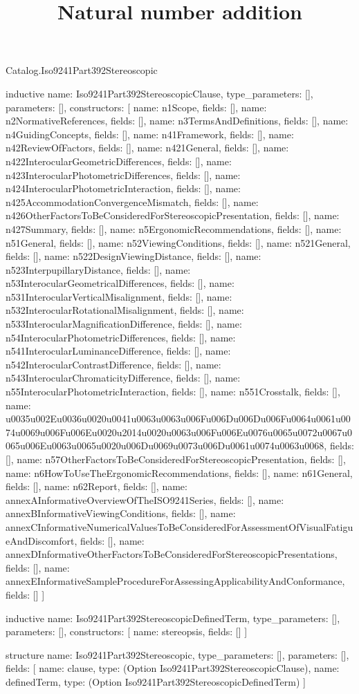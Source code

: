 \begin{lexlean}{Catalog.Iso9241Part392Stereoscopic}
\title{Natural number addition}
\begin{semanticmodule}
inductive{
  name: Iso9241Part392StereoscopicClause,
  type_parameters: [],
  parameters: [],
  constructors: [
    {name: n1Scope, fields: []},
    {name: n2NormativeReferences, fields: []},
    {name: n3TermsAndDefinitions, fields: []},
    {name: n4GuidingConcepts, fields: []},
    {name: n41Framework, fields: []},
    {name: n42ReviewOfFactors, fields: []},
    {name: n421General, fields: []},
    {name: n422InterocularGeometricDifferences, fields: []},
    {name: n423InterocularPhotometricDifferences, fields: []},
    {name: n424InterocularPhotometricInteraction, fields: []},
    {name: n425AccommodationConvergenceMismatch, fields: []},
    {name: n426OtherFactorsToBeConsideredForStereoscopicPresentation, fields: []},
    {name: n427Summary, fields: []},
    {name: n5ErgonomicRecommendations, fields: []},
    {name: n51General, fields: []},
    {name: n52ViewingConditions, fields: []},
    {name: n521General, fields: []},
    {name: n522DesignViewingDistance, fields: []},
    {name: n523InterpupillaryDistance, fields: []},
    {name: n53InterocularGeometricalDifferences, fields: []},
    {name: n531InterocularVerticalMisalignment, fields: []},
    {name: n532InterocularRotationalMisalignment, fields: []},
    {name: n533InterocularMagnificationDifference, fields: []},
    {name: n54InterocularPhotometricDifferences, fields: []},
    {name: n541InterocularLuminanceDifference, fields: []},
    {name: n542InterocularContrastDifference, fields: []},
    {name: n543InterocularChromaticityDifference, fields: []},
    {name: n55InterocularPhotometricInteraction, fields: []},
    {name: n551Crosstalk, fields: []},
    {name: u0035u002Eu0036u0020u0041u0063u0063u006Fu006Du006Du006Fu0064u0061u0074u0069u006Fu006Eu0020u2014u0020u0063u006Fu006Eu0076u0065u0072u0067u0065u006Eu0063u0065u0020u006Du0069u0073u006Du0061u0074u0063u0068, fields: []},
    {name: n57OtherFactorsToBeConsideredForStereoscopicPresentation, fields: []},
    {name: n6HowToUseTheErgonomicRecommendations, fields: []},
    {name: n61General, fields: []},
    {name: n62Report, fields: []},
    {name: annexAInformativeOverviewOfTheISO9241Series, fields: []},
    {name: annexBInformativeViewingConditions, fields: []},
    {name: annexCInformativeNumericalValuesToBeConsideredForAssessmentOfVisualFatigueAndDiscomfort, fields: []},
    {name: annexDInformativeOtherFactorsToBeConsideredForStereoscopicPresentations, fields: []},
    {name: annexEInformativeSampleProcedureForAssessingApplicabilityAndConformance, fields: []}
  ]
}

inductive{
  name: Iso9241Part392StereoscopicDefinedTerm,
  type_parameters: [],
  parameters: [],
  constructors: [
    {name: stereopsis, fields: []}
  ]
}

structure{
  name: Iso9241Part392Stereoscopic,
  type_parameters: [],
  parameters: [],
  fields: [
    {name: clause, type: (Option Iso9241Part392StereoscopicClause)},
    {name: definedTerm, type: (Option Iso9241Part392StereoscopicDefinedTerm)}
  ]
}
\end{semanticmodule}
\end{lexlean}
